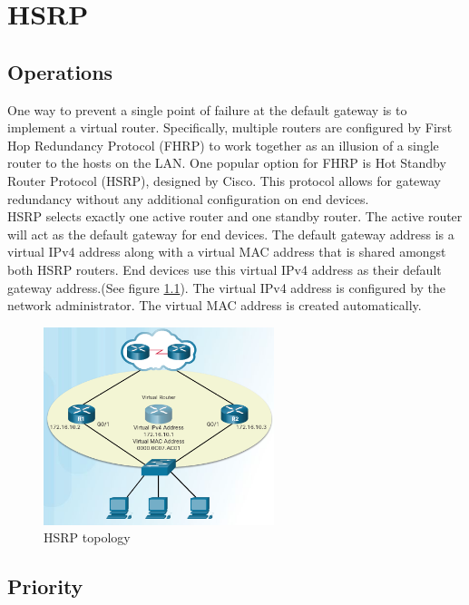 \chapter{HSRP}

\section{Operations}

One way to prevent a single point of failure at the default gateway is to implement a virtual router. Specifically, multiple routers are configured by First Hop Redundancy Protocol (FHRP) to work together as an illusion of a single router to the hosts on the LAN. One popular option for FHRP is Hot Standby Router Protocol (HSRP), designed by Cisco. This protocol allows for gateway redundancy without any additional configuration on end devices.\\
 
HSRP selects exactly one active router and one standby router. The active router will act as the default gateway for end devices. The default gateway address is a virtual IPv4 address along with a virtual MAC address that is shared amongst both HSRP routers. End devices use this virtual IPv4 address as their default gateway address.(See figure \ref{HSRP-topology}). The virtual IPv4 address is configured by the network administrator. The virtual MAC address is created automatically.

\begin{figure}[hbtp]
\centering
\includegraphics[width=0.6\textwidth]{pictures/HSRP.png}
\caption{HSRP topology}
\label{HSRP-topology}
\end{figure}

\section{Priority}

